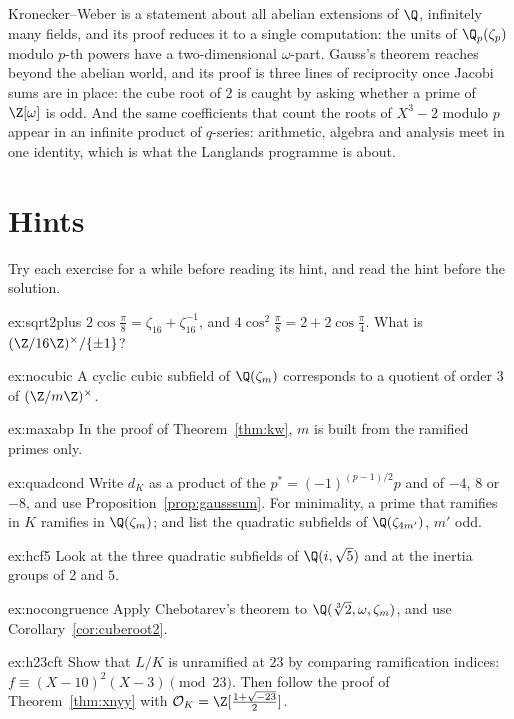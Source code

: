 \begin{beauty}
Kronecker--Weber is a statement about all abelian extensions of $\Q$, infinitely many fields, and its proof reduces it to a single computation: the
units of $\Q_p(\zeta_p)$ modulo $p$-th powers have a two-dimensional $\omega$-part. Gauss's theorem reaches beyond the abelian world, and its proof is
three lines of reciprocity once Jacobi sums are in place: the cube root of $2$ is caught by asking whether a prime of $\Z[\omega]$ is odd. And the same
coefficients that count the roots of $X^3-2$ modulo $p$ appear in an infinite product of $q$-series: arithmetic, algebra and analysis meet in one
identity, which is what the Langlands programme is about.
\end{beauty}

\section{Hints}

Try each exercise for a while before reading its hint, and read the hint before the solution.

\begin{hint}{ex:sqrt2plus}
$2\cos\frac\pi8=\zeta_{16}+\zeta_{16}^{-1}$, and $4\cos^2\frac\pi8=2+2\cos\frac\pi4$. What is $(\Z/16\Z)^\times/\{\pm1\}$?
\end{hint}
\begin{hint}{ex:nocubic}
A cyclic cubic subfield of $\Q(\zeta_m)$ corresponds to a quotient of order $3$ of $(\Z/m\Z)^\times$.
\end{hint}
\begin{hint}{ex:maxabp}
In the proof of Theorem~\ref{thm:kw}, $m$ is built from the ramified primes only.
\end{hint}
\begin{hint}{ex:quadcond}
Write $d_K$ as a product of the $p^*=(-1)^{(p-1)/2}p$ and of $-4$, $8$ or $-8$, and use Proposition~\ref{prop:gausssum}. For minimality, a prime that ramifies in
$K$ ramifies in $\Q(\zeta_m)$; and list the quadratic subfields of $\Q(\zeta_{4m'})$, $m'$ odd.
\end{hint}
\begin{hint}{ex:hcf5}
Look at the three quadratic subfields of $\Q(i,\sqrt5)$ and at the inertia groups of $2$ and $5$.
\end{hint}
\begin{hint}{ex:nocongruence}
Apply Chebotarev's theorem to $\Q(\sqrt[3]2,\omega,\zeta_m)$, and use Corollary~\ref{cor:cuberoot2}.
\end{hint}
\begin{hint}{ex:h23cft}
Show that $L/K$ is unramified at $23$ by comparing ramification indices: $f\equiv(X-10)^2(X-3)\pmod{23}$. Then follow the proof of Theorem~\ref{thm:xnyy}
with $\mathcal O_K=\Z[\frac{1+\sqrt{-23}}2]$.
\end{hint}

